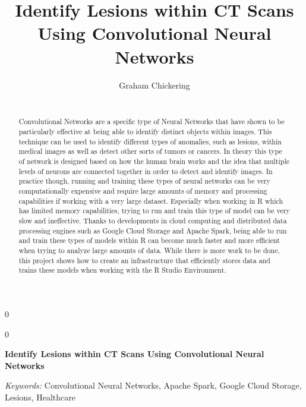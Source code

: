 \documentclass[12pt]{article}
\newcommand{\blind}{0}
\begin{document}
\def\spacingset#1{\renewcommand{\baselinestretch}%
{#1}\small\normalsize} \spacingset{1}



\blind
{
  \title{\bf Identify Lesions within CT Scans Using Convolutional Neural Networks}

  \author{
        Graham Chickering \\
    \\
      }
  \maketitle
} \fi

\blind
{
  \bigskip
  \bigskip
  \bigskip
  \begin{center}
    {\LARGE\bf Identify Lesions within CT Scans Using Convolutional Neural Networks}
  \end{center}
  \medskip
} \fi

\bigskip
\begin{abstract}
Convolutional Networks are a specific type of Neural Networks that have
shown to be particularly effective at being able to identify distinct
objects within images. This technique can be used to identify different
types of anomalies, such as lesions, within medical images as well as
detect other sorts of tumors or cancers. In theory this type of network
is designed based on how the human brain works and the idea that
multiple levels of neurons are connected together in order to detect and
identify images. In practice though, running and training these types of
neural networks can be very computationally expensive and require large
amounts of memory and processing capabilities if working with a very
large dataset. Especially when working in R which has limited memory
capabilities, trying to run and train this type of model can be very
slow and ineffective. Thanks to developments in cloud computing and
distributed data processing engines such as Google Cloud Storage and
Apache Spark, being able to run and train these types of models within R
can become much faster and more efficient when trying to analyze large
amounts of data. While there is more work to be done, this project shows
how to create an infrastructure that efficiently stores data and trains
these models when working with the R Studio Environment.
\end{abstract}

\noindent%
{\it Keywords:} Convolutional Neural Networks, Apache Spark, Google Cloud Storage,
Lesions, Healthcare
\vfill
\end{document}
